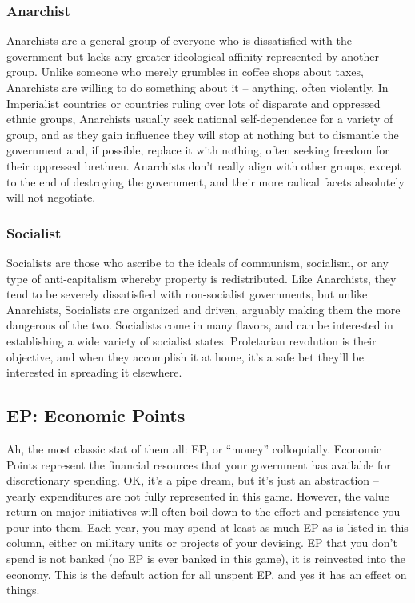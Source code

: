 \documentclass[11 pt]{scrartcl}
\begin{document}
\subsubsection*{Anarchist}

Anarchists are a general group of everyone who is dissatisfied with the government but lacks any greater ideological affinity represented by another group. Unlike someone who merely grumbles in coffee shops about taxes, Anarchists are willing to do something about it – anything, often violently. In Imperialist countries or countries ruling over lots of disparate and oppressed ethnic groups, Anarchists usually seek national self-dependence for a variety of group, and as they gain influence they will stop at nothing but to dismantle the government and, if possible, replace it with nothing, often seeking freedom for their oppressed brethren. Anarchists don’t really align with other groups, except to the end of destroying the government, and their more radical facets absolutely will not negotiate.

\subsubsection*{Socialist}

Socialists are those who ascribe to the ideals of communism, socialism, or any type of anti-capitalism whereby property is redistributed. Like Anarchists, they tend to be severely dissatisfied with non-socialist governments, but unlike Anarchists, Socialists are organized and driven, arguably making them the more dangerous of the two. Socialists come in many flavors, and can be interested in establishing a wide variety of socialist states. Proletarian revolution is their objective, and when they accomplish it at home, it’s a safe bet they’ll be interested in spreading it elsewhere.

\subsection{EP: Economic Points}

Ah, the most classic stat of them all: EP, or ``money'' colloquially. Economic Points represent the financial resources that your government has available for discretionary spending. OK, it's a pipe dream, but it's just an abstraction -- yearly expenditures are not fully represented in this game. However, the value return on major initiatives will often boil down to the effort and persistence you pour into them. Each year, you may spend at least as much EP as is listed in this column, either on military units or projects of your devising. EP that you don't spend is not banked (no EP is ever banked in this game), it is reinvested into the economy. This is the default action for all unspent EP, and yes it has an effect on things.
\end{document}
